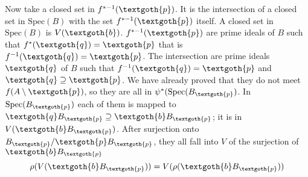 \documentclass{article}
\begin{document}
Now take a closed set in $f^{*-1}(\textgoth{p})$. It is the intersection of a closed set in $\textrm{Spec}(B)$ with the set $f^{*-1}(\textgoth{p})$ itself. A closed set in $\textrm{Spec}(B)$ is $V(\textgoth{b})$. $f^{*-1}(\textgoth{p})$ are prime ideals of $B$ such that $f^*(\textgoth{q}) = \textgoth{p}$ that is $f^{-1}(\textgoth{q}) = \textgoth{p}$. The intersection are prime ideals $\textgoth{q}$ of $B$ such that $f^{-1}(\textgoth{q}) = \textgoth{p}$ and $\textgoth{q} \supseteq \textgoth{p}$. We have already proved that they do not meet $f(A \setminus \textgoth{p})$, so they are all in $\psi^*(\textrm{Spec}(B_\textgoth{p})$. In $\textrm{Spec}(B_\textgoth{p})$ each of them is mapped to $\textgoth{q}B_\textgoth{p} \supseteq \textgoth{b}B_\textgoth{p}$; it is in $V(\textgoth{b}B_\textgoth{p})$. After surjection onto $B_\textgoth{p}/\textgoth{p}B_\textgoth{p}$, they all fall into $V$ of the surjection of $\textgoth{b}B_\textgoth{p}$
\[
\rho(V(\textgoth{b}B_\textgoth{p})) = V(\rho(\textgoth{b}B_\textgoth{p}))
\]
\end{document}
